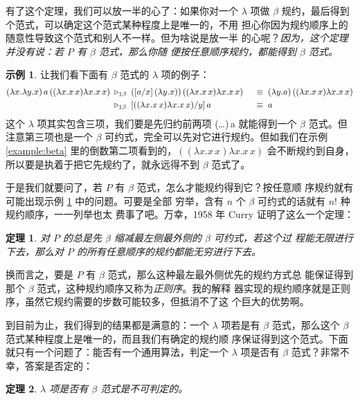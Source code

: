 \documentclass[a4paper,adobefonts]{ctexart}
\newtheorem{theorem}{定理}
\theoremstyle{definition}
\newtheorem{example}{示例}
\begin{document}
有了这个定理，我们可以放一半的心了：如果你对一个 $\lambda$ 项做
$\beta$ 规约，最后得到个范式，可以确定这个范式某种程度上是唯一的，不用
担心你因为规约顺序上的随意性导致这个范式和别人不一样。但为啥说是放一半
的心呢？\emph{因为，这个定理并没有说：若 $P$ 有 $\beta$ 范式，那么你随
  便按任意顺序规约，都能得到 $\beta$ 范式。}

\begin{example}\label{example:diffdiverge}
  让我们看下面有 $\beta$ 范式的 $\lambda$ 项的例子：
  \begin{alignat*}{2}
    (\lambda x.\lambda y. x)\,a\,((\lambda x.x\,x)\lambda x.x\,x)\; &\triangleright_{1\beta}\;
    ([a/x]\,(\lambda y.x))\,((\lambda x.x\,x)\lambda x.x\,x) &\; &\equiv\; (\lambda y.a)\,((\lambda x.x\,x)\lambda x.x\,x)\\
    &\triangleright_{1\beta}\; [((\lambda x.x\,x)\lambda x.x\,x)/y]\,a & &\equiv\; a
  \end{alignat*}
  这个 $\lambda$ 项其实包含三项，我们要是先归约前两项
  (\lambda\dots)\,a 就能得到一个 $\beta$ 范式。但注意第三项也是一个
  $\beta$ 可约式，完全可以先对它进行规约。但如我们在示例
  \ref{example:beta} 里的倒数第二项看到的，$((\lambda x.x\,x)\lambda
  x.x\,x)$ 会不断规约到自身，所以要是执着于把它先规约了，就永远得不到
  $\beta$ 范式了。
\end{example}

于是我们就要问了，若 $P$ 有 $\beta$ 范式，怎么才能规约得到它？按任意顺
序规约就有可能出现示例 \ref{example:diffdiverge} 中的问题。可要是全部
穷举，含有 $n$ 个 $\beta$ 可约式的话就有 $n!$ 种规约顺序，一一列举也太
费事了吧。万幸，1958 年 Curry 证明了这么一个定理：

\begin{theorem}
  对 $P$ 的总是先 $\beta$ 缩减最左侧最外侧的 $\beta$ 可约式，若这个过
  程能无限进行下去，那么对 $P$ 的所有任意顺序的规约都能无穷进行下去。
\end{theorem}

换而言之，要是 $P$ 有 $\beta$ 范式，那么这种最左最外侧优先的规约方式总
能保证得到那个 $\beta$ 范式，这种规约顺序又称为\emph{正则序}。我的解释
器实现的规约顺序就是正则序，虽然它规约需要的步数可能较多，但抵消不了这
个巨大的优势啊。

到目前为止，我们得到的结果都是满意的：一个 $\lambda$ 项若是有 $\beta$
范式，那么这个 $\beta$ 范式某种程度上是唯一的，而且我们有确定的规约顺
序保证得到这个范式。下面就只有一个问题了：能否有一个通用算法，判定一个
$\lambda$ 项是否有 $\beta$ 范式？非常不幸，答案是否定的：

\begin{theorem}
  $\lambda$ 项是否有 $\beta$ 范式是不可判定的。
\end{theorem}
\end{document}
